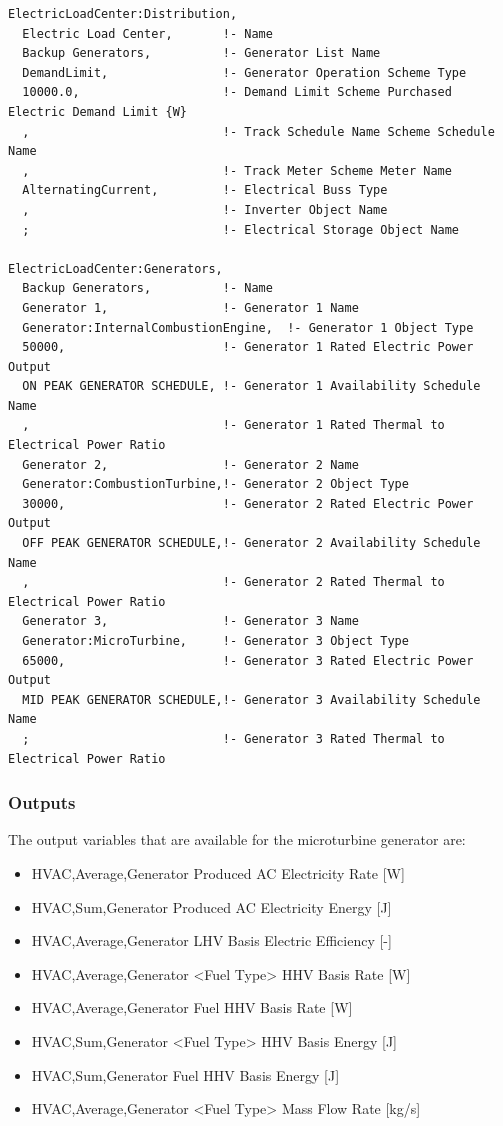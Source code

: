 \begin{lstlisting}
ElectricLoadCenter:Distribution,
  Electric Load Center,       !- Name
  Backup Generators,          !- Generator List Name
  DemandLimit,                !- Generator Operation Scheme Type
  10000.0,                    !- Demand Limit Scheme Purchased Electric Demand Limit {W}
  ,                           !- Track Schedule Name Scheme Schedule Name
  ,                           !- Track Meter Scheme Meter Name
  AlternatingCurrent,         !- Electrical Buss Type
  ,                           !- Inverter Object Name
  ;                           !- Electrical Storage Object Name

ElectricLoadCenter:Generators,
  Backup Generators,          !- Name
  Generator 1,                !- Generator 1 Name
  Generator:InternalCombustionEngine,  !- Generator 1 Object Type
  50000,                      !- Generator 1 Rated Electric Power Output
  ON PEAK GENERATOR SCHEDULE, !- Generator 1 Availability Schedule Name
  ,                           !- Generator 1 Rated Thermal to Electrical Power Ratio
  Generator 2,                !- Generator 2 Name
  Generator:CombustionTurbine,!- Generator 2 Object Type
  30000,                      !- Generator 2 Rated Electric Power Output
  OFF PEAK GENERATOR SCHEDULE,!- Generator 2 Availability Schedule Name
  ,                           !- Generator 2 Rated Thermal to Electrical Power Ratio
  Generator 3,                !- Generator 3 Name
  Generator:MicroTurbine,     !- Generator 3 Object Type
  65000,                      !- Generator 3 Rated Electric Power Output
  MID PEAK GENERATOR SCHEDULE,!- Generator 3 Availability Schedule Name
  ;                           !- Generator 3 Rated Thermal to Electrical Power Ratio
\end{lstlisting}

\subsubsection{Outputs}\label{outputs-7-002}

The output variables that are available for the microturbine generator are:

\begin{itemize}
\item
  HVAC,Average,Generator Produced AC Electricity Rate {[}W{]}
\item
  HVAC,Sum,Generator Produced AC Electricity Energy {[}J{]}
\item
  HVAC,Average,Generator LHV Basis Electric Efficiency {[}-{]}
\item
  HVAC,Average,Generator \textless{}Fuel Type\textgreater{} HHV Basis Rate {[}W{]}
\item
  HVAC,Average,Generator Fuel HHV Basis Rate {[}W{]}
\item
  HVAC,Sum,Generator \textless{}Fuel Type\textgreater{} HHV Basis Energy {[}J{]}
\item
  HVAC,Sum,Generator Fuel HHV Basis Energy {[}J{]}
\item
  HVAC,Average,Generator \textless{}Fuel Type\textgreater{} Mass Flow Rate {[}kg/s{]}
\end{itemize}

